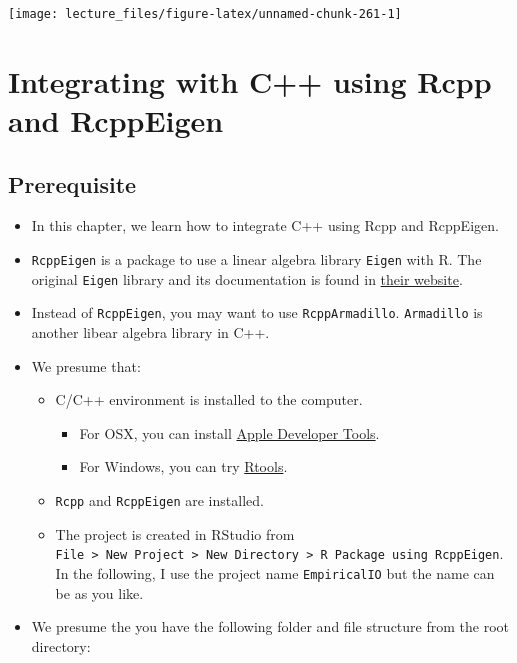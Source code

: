 \documentclass[
]{book}
\providecommand{\tightlist}{%
  \setlength{\itemsep}{0pt}\setlength{\parskip}{0pt}}
\begin{document}
\begin{center}\texttt{[image: lecture\_files/figure-latex/unnamed-chunk-261-1]} \end{center}

\hypertarget{rcpp}{%
\chapter{Integrating with C++ using Rcpp and RcppEigen}\label{rcpp}}

\hypertarget{prerequisite}{%
\section{Prerequisite}\label{prerequisite}}

\begin{itemize}
\tightlist
\item
  In this chapter, we learn how to integrate C++ using Rcpp and RcppEigen.
\item
  \texttt{RcppEigen} is a package to use a linear algebra library \texttt{Eigen} with R. The original \texttt{Eigen} library and its documentation is found in \href{http://eigen.tuxfamily.org/index.php?title=Main_Page}{their website}.
\item
  Instead of \texttt{RcppEigen}, you may want to use \texttt{RcppArmadillo}. \texttt{Armadillo} is another libear algebra library in C++.
\item
  We presume that:

  \begin{itemize}
  \tightlist
  \item
    C/C++ environment is installed to the computer.

    \begin{itemize}
    \tightlist
    \item
      For OSX, you can install \href{https://developer.apple.com/xcode/}{Apple Developer Tools}.
    \item
      For Windows, you can try \href{https://cran.r-project.org/bin/windows/Rtools/}{Rtools}.
    \end{itemize}
  \item
    \texttt{Rcpp} and \texttt{RcppEigen} are installed.
  \item
    The project is created in RStudio from \texttt{File\ \textgreater{}\ New\ Project\ \textgreater{}\ New\ Directory\ \textgreater{}\ R\ Package\ using\ RcppEigen}. In the following, I use the project name \texttt{EmpiricalIO} but the name can be as you like.
  \end{itemize}
\item
  We presume the you have the following folder and file structure from the root directory:


\end{itemize}
\end{document}
